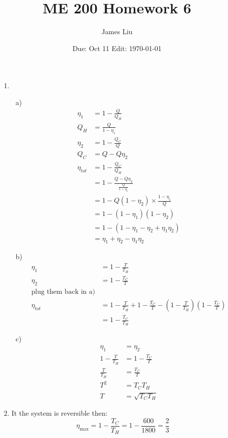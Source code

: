 \documentclass{article}
\date{Due: Oct 11  Edit: \today}
\title{ME 200 Homework 6}
\author{James Liu}
\begin{document}
\maketitle
\begin{itemize}
    \item [1.] 
    \begin{itemize}
        \item [a)]
        \begin{align*}
            \eta_1 &= 1-\frac{Q}{Q_H}\\
            Q_H &= \frac{Q}{1-\eta_1}\\
            \eta_2 &= 1-\frac{Q_C}{Q}\\
            Q_C &=Q-Q\eta_2\\
            \eta_{tot} &= 1-\frac{Q_C}{Q_H}\\
            &=1-\frac{Q-Q\eta_2}{\frac{Q}{1-\eta_1}}\\
            &=1-Q(1-\eta_2)\times\frac{1-\eta_1}{Q}\\
            &=1-(1-\eta_1)(1-\eta_2)\\
            &=1-(1-\eta_1-\eta_2+\eta_1\eta_2)\\
            &=\eta_1+\eta_2-\eta_1\eta_2
        \end{align*}
        \item [b)]
        \begin{align*}
            \eta_1 &= 1-\frac{T}{T_H}\\
            \eta_2 &= 1-\frac{T_C}{T}\\
            \text{plug them back in a)}\\
            \eta_{tot} &= 1-\frac{T}{T_H}+1-\frac{T_C}{T}-(1-\frac{T}{T_H})(1-\frac{T_C}{T})
            \\ &=1-\frac{T_C}{T_H}
        \end{align*}
        \newpage
        \item [c)]
        \begin{align*}
            \eta_1&=\eta_2\\
            1-\frac{T}{T_H}&=1-\frac{T_C}{T}\\
            \frac{T}{T_H}&=\frac{T_C}{T}\\
            T^2 &=T_CT_H\\
            T &=\sqrt{T_CT_H}
        \end{align*}
    \end{itemize}
    \item [2.] It the system is reversible then:\[\eta_{\text{max}} = 1-\frac{T_C}{T_H} = 1-\frac{600}{1800} = \frac{2}{3}\]

\end{itemize}
\end{document}

